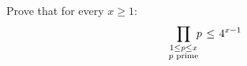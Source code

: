 Prove that for every $x \geq 1$:
\begin{equation*}
  \prod\limits_{\underset{\scriptstyle{p \text{ prime}}}{1 \leq p \leq x}} {\mspace{-6mu} p}  \mspace{2mu}
  \leq \mspace{2mu}
  4^{x - 1}
\end{equation*}

%
